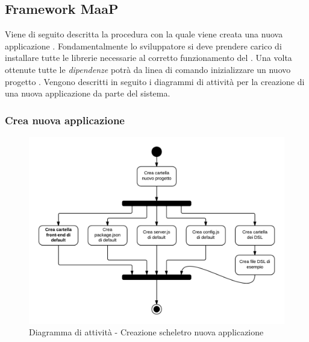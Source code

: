 %
%
%
%

\subsection{Framework MaaP}

Viene di seguito descritta la procedura con la quale viene creata una nuova applicazione . Fondamentalmente lo sviluppatore si deve prendere carico di installare tutte le librerie necessarie al corretto funzionamento del . Una volta ottenute tutte le \textit{dipendenze} potrà da linea di comando inizializzare un nuovo progetto . Vengono descritti in seguito i diagrammi di attività per la creazione di una nuova applicazione da parte del sistema.

\subsubsection{Crea nuova applicazione}

\begin{figure}[H]
\centering
\includegraphics[scale=0.2]{uml/attivita/Framework - Diagramma di installazione.png}
\caption{Diagramma di attività - Creazione scheletro nuova applicazione}
\end{figure}

